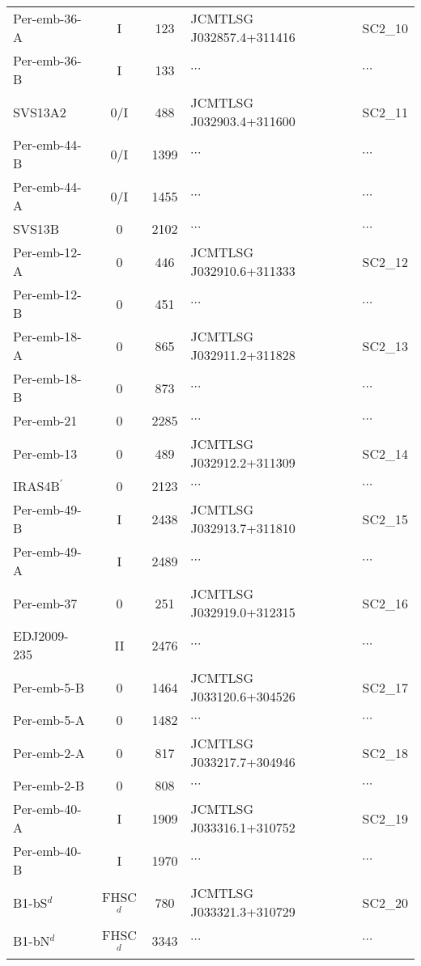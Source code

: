 \documentclass[usenatbib,a4paper]{mnras}
\begin{document}
{\begin{table*}
\begin{threeparttable}
\begin{tabular}{lccll}
\hline
Per-emb-36-A 		& I 		& 123 	& JCMTLSG J032857.4+311416 	& SC2\_10 \\
Per-emb-36-B 		& I 		& 133 	& $\cdots$ & $\cdots$ 		 \\
\hline
SVS13A2 			& 0/I 		& 488 	& JCMTLSG J032903.4+311600 	& SC2\_11 \\   %
Per-emb-44-B 		& 0/I 		& 1399 	& $\cdots$ & $\cdots$ 		 \\
Per-emb-44-A 		& 0/I 		& 1455 	& $\cdots$ & $\cdots$ 		 \\
SVS13B 			& 0 		& 2102 	& $\cdots$ & $\cdots$ 		 \\
\hline
Per-emb-12-A 		& 0 		& 446 	& JCMTLSG J032910.6+311333 	& SC2\_12 \\
Per-emb-12-B 		& 0 		& 451 	& $\cdots$ & $\cdots$ 		 \\
\hline
Per-emb-18-A 		& 0 		& 865 	& JCMTLSG J032911.2+311828 	& SC2\_13 \\
Per-emb-18-B 		& 0 		& 873 	& $\cdots$ & $\cdots$ 		 \\
Per-emb-21 		& 0 		& 2285 	& $\cdots$ & $\cdots$ 		 \\
\hline
Per-emb-13 		& 0 		& 489 	& JCMTLSG J032912.2+311309 	& SC2\_14 \\
IRAS4B$^{\prime}$ 	& 0 		& 2123	& $\cdots$ & $\cdots$ 		 \\
\hline
Per-emb-49-B 		& I 		& 2438 	& JCMTLSG J032913.7+311810 	& SC2\_15 \\
Per-emb-49-A 		& I 		& 2489 	& $\cdots$ & $\cdots$ 		 \\
\hline
Per-emb-37 		& 0 		& 251 	& JCMTLSG J032919.0+312315 	& SC2\_16 \\
EDJ2009-235 		& II 		& 2476 	& $\cdots$ & $\cdots$ 		 \\
\hline
Per-emb-5-B 		& 0 		& 1464 	& JCMTLSG J033120.6+304526	& SC2\_17 \\
Per-emb-5-A 		& 0 		& 1482 	& $\cdots$ & $\cdots$ 		\\
\hline
Per-emb-2-A 		& 0 		& 817 	& JCMTLSG J033217.7+304946 	& SC2\_18 \\
Per-emb-2-B 		& 0 		& 808 	& $\cdots$ & $\cdots$ 		 \\
\hline
Per-emb-40-A 		& I 		& 1909 	& JCMTLSG J033316.1+310752 	& SC2\_19 \\
Per-emb-40-B 		& I 		& 1970 	& $\cdots$ & $\cdots$ 		 \\
\hline
B1-bS$^{d}$ & FHSC$^{d}$  & 780 		& JCMTLSG J033321.3+310729 	& SC2\_20\\
B1-bN$^{d}$ & FHSC$^{d}$  & 3343 	& $\cdots$ & $\cdots$ 		 \\

\end{tabular}
\end{threeparttable}
\end{table*}}
\end{document}

